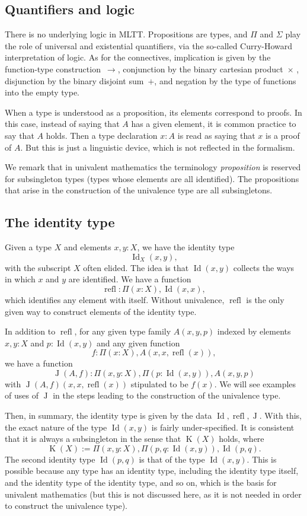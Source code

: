 \documentclass{article}
\newcommand{\Id}{\operatorname{Id}}
\newcommand{\J}{\operatorname{J}}
\newcommand{\refl}{\operatorname{refl}}
\newcommand{\K}{\operatorname{K}}
\begin{document}
\subsection{Quantifiers and logic}

There is no underlying logic in MLTT. Propositions are types, and
$\Pi$ and $\Sigma$ play the role of universal and existential
quantifiers, via the so-called Curry-Howard interpretation of
logic. As for the connectives, implication is given by the
function-type construction~$\to$, conjunction by the binary cartesian
product~$\times$ , disjunction by the binary disjoint sum~$+$, and
negation by the type of functions into the empty type.

When a type is understood as a proposition, its elements correspond to
proofs.  In this case, instead of saying that $A$ has a given element,
it is common practice to say that $A$ holds. Then a type declaration
$x:A$ is read as saying that $x$ is a proof of $A$. But this is just a
linguistic device, which is not reflected in the formalism.

We remark that in univalent mathematics the terminology
\emph{proposition} is reserved for subsingleton types (types whose
elements are all identified). The propositions that arise in the
construction of the univalence type are all subsingletons.

\subsection{The identity type}

Given a type $X$ and elements $x,y:X$, we have the identity type
\[
    \Id_X(x,y),
\]
with the subscript $X$ often elided. The idea is that $\Id(x,y)$ collects
the ways in which $x$ and $y$ are identified.
%
We have a function
\[
    \refl : \Pi(x:X), \Id(x,x),
\]
which identifies any element with itself. Without univalence, $\refl$ is
the only given way to construct elements of the identity type.

In addition to $\refl$, for any given type family $A(x,y,p)$
indexed by elements $x,y:X$ and $p:\Id(x,y)$ and any given function
\[
    f : \Pi(x:X), A(x,x,\refl(x)),
\]
we have a function 
\[
 \J(A,f) :  \Pi(x,y:X), \Pi(p:\Id(x,y)), A(x,y,p)
\]  
with $\J(A,f)(x,x,\refl(x))$ stipulated to be $f(x)$.  
We will see examples of uses of $\J$ in the steps leading to the
construction of the univalence type.

Then, in summary, the identity type is given by the data $\Id,\refl,\J$.
%
With this, the exact nature of the type $\Id(x,y)$ is fairly
under-specified. It is consistent that it is always a subsingleton in
the sense that $\K(X)$ holds, where
\[
   \K(X) := \Pi(x,y:X), \Pi(p,q:\Id(x,y)), \Id(p,q).
\]
The second identity type $\Id(p,q)$ is that of the type
$\Id(x,y)$. This is possible because any type has an identity type,
including the identity type itself, and the identity type of the
identity type, and so on, which is the basis for univalent mathematics
(but this is not discussed here, as it is not needed in order to
construct the univalence type).
\end{document}
